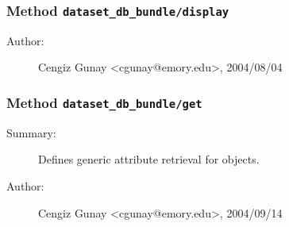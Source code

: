 \subsubsection[Method \texttt{display}]{Method \texttt{dataset\_db\_bundle/display}}%
%
\label{ref_dataset_db_bundle__display}%
\hypertarget{ref_dataset_db_bundle__display}{}%
\begin{description}
%
%
%
%
%
%
%
\item[Author:]%
Cengiz Gunay <cgunay@emory.edu>, 2004/08/04
%
\end{description}
\methodline%
\subsubsection[Method \texttt{get}]{Method \texttt{dataset\_db\_bundle/get}}%
%
\label{ref_dataset_db_bundle__get}%
\hypertarget{ref_dataset_db_bundle__get}{}%
\begin{description}
\item[Summary:]Defines generic attribute retrieval for objects.
%
%
%
%
%
%
%
\item[Author:]%
Cengiz Gunay <cgunay@emory.edu>, 2004/09/14
%
\end{description}
\methodline%
